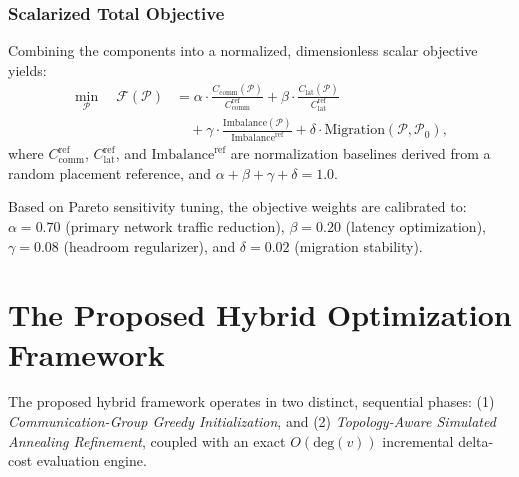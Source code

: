 \documentclass[conference]{IEEEtran}
\begin{document}
\subsubsection{Scalarized Total Objective}
Combining the components into a normalized, dimensionless scalar objective yields:
\begin{equation}
\begin{aligned}
\min_{\mathcal{P}} \quad \mathcal{F}(\mathcal{P}) &= \alpha \cdot \frac{C_{\mathrm{comm}}(\mathcal{P})}{C_{\mathrm{comm}}^{\mathrm{ref}}} + \beta \cdot \frac{C_{\mathrm{lat}}(\mathcal{P})}{C_{\mathrm{lat}}^{\mathrm{ref}}} \\
&\quad + \gamma \cdot \frac{\mathrm{Imbalance}(\mathcal{P})}{\mathrm{Imbalance}^{\mathrm{ref}}} + \delta \cdot \mathrm{Migration}(\mathcal{P}, \mathcal{P}_0),
\end{aligned}
\end{equation}
where $C_{\mathrm{comm}}^{\mathrm{ref}}$, $C_{\mathrm{lat}}^{\mathrm{ref}}$, and $\mathrm{Imbalance}^{\mathrm{ref}}$ are normalization baselines derived from a random placement reference, and $\alpha + \beta + \gamma + \delta = 1.0$.

Based on Pareto sensitivity tuning, the objective weights are calibrated to:
$\alpha = 0.70$ (primary network traffic reduction), $\beta = 0.20$ (latency optimization), $\gamma = 0.08$ (headroom regularizer), and $\delta = 0.02$ (migration stability).

\section{The Proposed Hybrid Optimization Framework}
\label{sec:hybrid}

The proposed hybrid framework operates in two distinct, sequential phases: (1) \emph{Communication-Group Greedy Initialization}, and (2) \emph{Topology-Aware Simulated Annealing Refinement}, coupled with an exact $O(\mathrm{deg}(v))$ incremental delta-cost evaluation engine.
\end{document}
